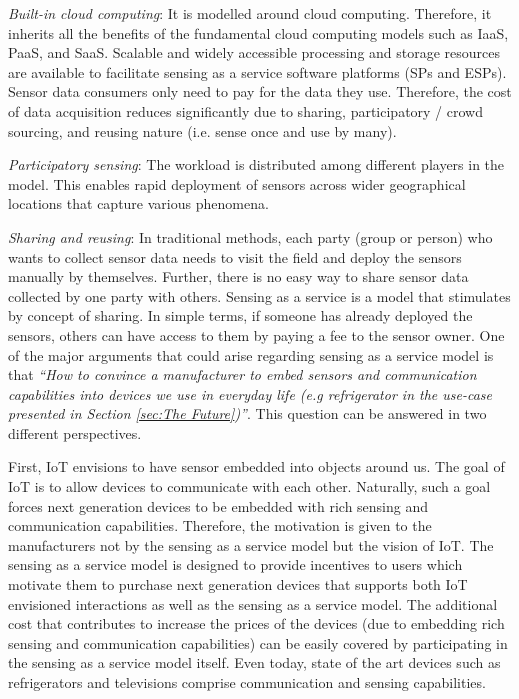\documentclass[times]{ettauth}
\newenvironment{noindlist}
 {\begin{list}{\labelitemi}{\leftmargin=1.2em \itemindent=-.5em}}
 {\end{list}}
\begin{document}
\begin{noindlist}
\item \textit{Built-in cloud computing}: It is modelled around cloud computing. Therefore, it inherits all the benefits of the fundamental cloud computing models such as IaaS, PaaS, and SaaS. Scalable and widely accessible processing and storage resources are available to facilitate sensing as a service software platforms (SPs and ESPs). Sensor data consumers only need to pay for the data they use. Therefore, the cost of data acquisition reduces significantly due to sharing, participatory / crowd sourcing,  and reusing nature (i.e. sense once and use by many). 

\item  \textit{Participatory sensing}: The workload is distributed among different players in the model. This enables rapid deployment of sensors across wider geographical locations that capture various phenomena.

\item  \textit{Sharing and reusing}: In traditional methods, each party (group or person) who wants to collect sensor data needs to visit the field and deploy the sensors manually by themselves. Further, there is no easy way to share  sensor data collected by one party with others. Sensing as a service is a model that stimulates by concept of sharing. In simple terms, if someone has already deployed the sensors, others can have access to them by paying a fee to the sensor owner. One of the major arguments that could arise regarding sensing as a service model is that \textit{``How to convince a manufacturer to embed sensors and communication capabilities into devices we use in everyday life (e.g refrigerator in the use-case presented in Section \ref{sec:The Future})''}. This question can be answered in two different perspectives. 

First, IoT envisions to have sensor embedded into objects around us. The goal of IoT is to allow devices to communicate with each other. Naturally, such a goal forces next generation devices to be embedded with rich sensing and communication capabilities. Therefore, the motivation is given to the manufacturers not by the sensing as a service model but the vision of IoT.  The sensing as a service model is designed to provide incentives to users which motivate them to purchase next generation devices that supports both IoT envisioned interactions as well as the sensing as a service model. The additional cost that contributes to increase the prices of the devices (due to embedding rich sensing and communication capabilities) can be easily covered by participating in the sensing as a service model itself. Even today, state of the art devices such as refrigerators and televisions comprise communication and sensing capabilities.




\end{noindlist}
\end{document}
